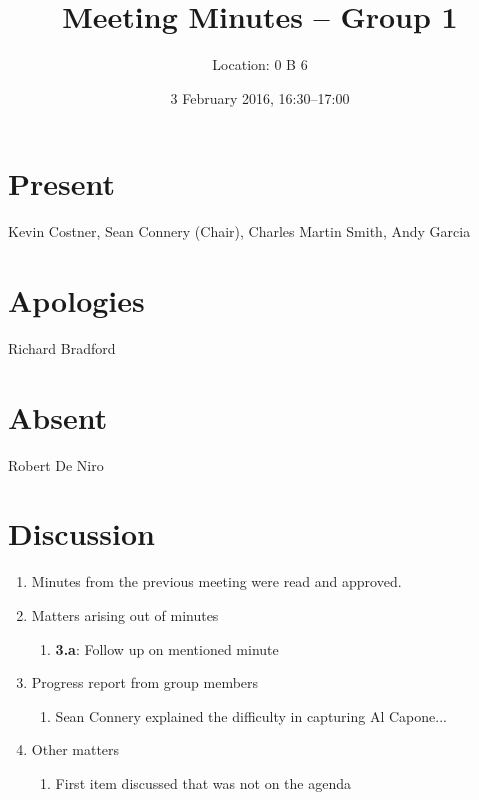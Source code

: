 \documentclass[11pt,a4paper]{scrartcl}
\title{Meeting Minutes -- Group 1}
\author{Location: 0 B 6}
\date{3 February 2016, 16:30--17:00}
\begin{document}
\maketitle

\section*{Present}
Kevin Costner,
Sean Connery (Chair),
Charles Martin Smith,
Andy Garcia

\section*{Apologies}
Richard Bradford

\section*{Absent}
Robert De Niro

\section*{Discussion}

\begin{enumerate}


\item Minutes from the previous meeting were read and approved.

\item Matters arising out of minutes
   \begin{enumerate}
   \item \textbf{3.a}: Follow up on mentioned minute
   \end{enumerate}

\item Progress report from group members
   \begin{enumerate}
   \item Sean Connery explained the difficulty in capturing Al Capone...
   \end{enumerate}


\item Other matters
   \begin{enumerate}
   \item First item discussed that was not on the agenda
   \end{enumerate}

\end{enumerate}
\end{document}
